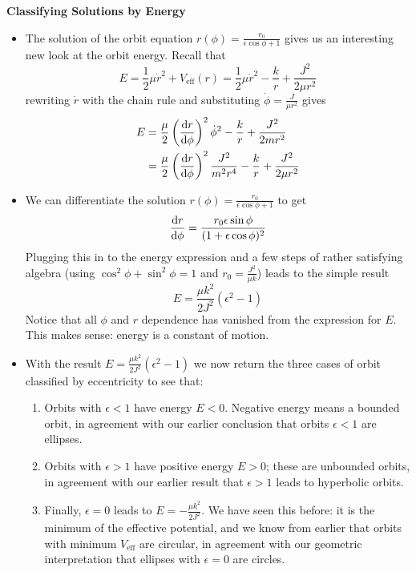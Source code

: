 \documentclass[11pt, a4paper]{article}
\newcommand{\veff}{V_{\text{eff}}}
\begin{document}
\textbf{Classifying Solutions by Energy}
\begin{itemize}
	\item The solution of the orbit equation $ r(\phi)  = \frac{r_{0}}{\epsilon \cos \phi + 1}$ gives us an interesting new look at the orbit energy. Recall that
	\begin{equation*}
		E = \frac{1}{2}\mu \dot{r}^{2} + \veff(r) = \frac{1}{2}\mu \dot{r}^{2} - \frac{k}{r} + \frac{J^{2}}{2\mu r^{2}}
	\end{equation*}
	rewriting $ \dot{r} $ with the chain rule and substituting $ \dot{\phi} = \frac{J}{\mu r^{2}} $ gives
	\begin{align*}
		E &= \frac{\mu}{2}\left(\dv{r}{\phi}\right)^{2} \dot{\phi}^{2} - \frac{k}{r} + \frac{J^{2}}{2mr^{2}} \\
		& = \frac{\mu}{2}\left(\dv{r}{\phi}\right)^{2} \frac{J^{2}}{m^{2}r^{4}} - \frac{k}{r} + \frac{J^{2}}{2\mu r^{2}}
	\end{align*}
	
	\item We can differentiate the solution $ r(\phi) = \frac{r_{0}}{\epsilon \cos \phi + 1} $ to get
	\begin{equation*}
		\dv{r}{\phi} = \frac{r_{0}\epsilon \sin \phi}{(1 + \epsilon \cos \phi)^{2}}
	\end{equation*}
	Plugging this in to the energy expression and a few steps of rather satisfying algebra (using $ \cos^{2} \phi + \sin^{2} \phi = 1 $ and $ r_{0} = \frac{J^{2}}{\mu k} $) leads to the simple result
	\begin{equation*}
		E = \frac{\mu k^{2}}{2J^{2}} (\epsilon^{2} - 1)
	\end{equation*}
	Notice that all $ \phi $ and $ r $ dependence has vanished from the expression for $ E $. This makes sense: energy is a constant of motion.
	
	\item With the result $ E = \frac{\mu k^{2}}{2J^{2}} (\epsilon^{2} - 1) $ we now return the three cases of orbit classified by eccentricity to see that:
	\begin{enumerate}
		\item Orbits with $ \epsilon < 1 $ have energy $ E < 0 $. Negative energy means a bounded orbit, in agreement with our earlier conclusion that orbits $ \epsilon < 1 $ are ellipses.
		
		\item Orbits with $ \epsilon > 1 $ have positive energy $ E > 0 $; these are unbounded orbits, in agreement with our earlier result that $ \epsilon > 1 $ leads to hyperbolic orbits.
		
		\item Finally, $ \epsilon = 0 $ leads to $ E = - \frac{\mu k^{2}}{2J^{2}} $. We have seen this before: it is the minimum of the effective potential, and we know from earlier that orbits with minimum $ \veff $ are circular, in agreement with our geometric interpretation that ellipses with $ \epsilon = 0 $ are circles.
		
	\end{enumerate}
\end{itemize}
\end{document}
